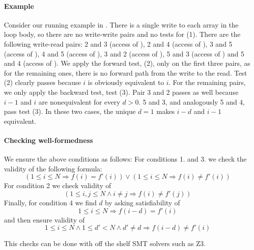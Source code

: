 \paragraph{Example} Consider our running example in . 
There is a single write to each array in the loop body,  so there are no write-write pairs and no 
tests for (1). There are the following write-read pairs: 2 and 3 (access of \A), 
2 and 4 (access of \A), 3 and 5 (access of \B), 4 and 5 (access of \C), 3 and 2 (access of \B), 5 and 3 (access of \D) 
and 5 and 4 (access of \D).
We apply the forward test, (2), only on the first three pairs, as for the remaining ones, there is no forward path from 
the write to the read. 
Test (2) clearly passes because $i$ is obviously equivalent to $i$. For the remaining pairs, we only apply the backward 
test, test (3). 
Pair 3 and 2 passes as well because $i-1$ and $i$ are nonequivalent for every $d > 0$. 5 and 3, and analogously 5 and 
4, pass test (3). 
In these two cases, the unique $d = 1$ makes $i - d$ and $i-1$ equivalent. 

\paragraph{Checking well-formedness}


We ensure the above conditions as follows:
For conditions 1. and 3. we check the validity of the following formula: 
\begin{equation}
(1 \le i \le N \Rightarrow f(i) = f'(i)) \vee (1 \le i \le N \Rightarrow f(i) \neq f'(i))
\end{equation}
For condition 2 we check validity of
\begin{equation}
(1 \le i,j \le N \wedge i\neq j \Rightarrow f(i) \neq f'(j))
\end{equation}
Finally, for condition 4 we find $d$ by asking satisfiability of
\begin{equation}
1 \le i \le N \Rightarrow f(i-d) = f'(i)
\end{equation}
and then ensure validity of
\begin{equation}
1 \le i \le N \wedge 1 \le d' < N \wedge d' \neq d \Rightarrow f(i-d) \neq f'(i)
\end{equation}

This checks can be done with off the shelf SMT solvers such as Z3. 




